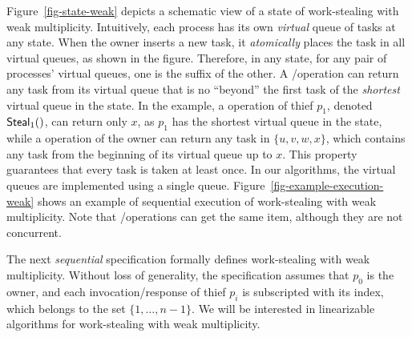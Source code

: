 Figure~\ref{fig-state-weak} depicts a schematic view of a state of work-stealing with weak multiplicity.  Intuitively, each process has its own \emph{virtual} queue of tasks at any state.  When the owner inserts a new task, it \emph{atomically} places the task in all virtual queues, as shown in the figure.  Therefore, in any state, for any pair of processes' virtual queues, one is the suffix of the other.  A \Take/\Steal operation can return any task from its virtual queue that is no ``beyond'' the first task of the \emph{shortest} virtual queue in the state. In the example, a \Steal operation of thief $p_1$, denoted ${\sf \small Steal}_1()$, can return only $x$, as $p_1$ has the shortest virtual queue in the state, while a \Take operation of the owner can return any task in $\{u,v,w,x\}$, which contains any task from the beginning of its virtual queue up to $x$.  This property guarantees that every task is taken at least once.  In our algorithms, the virtual queues are implemented using a single queue.  Figure~\ref{fig-example-execution-weak} shows an example of sequential execution of work-stealing with weak multiplicity. Note that \Take/\Steal operations can get the same item, although they are not concurrent.

The next \emph{sequential} specification formally defines work-stealing with weak multiplicity.  Without loss of generality, the specification assumes that \(p_0\) is the owner, and each invocation/response of thief \(p_i\) is subscripted with its index, which belongs to the set \(\{1, \hdots, n-1\}\).  We will be interested in linearizable algorithms for work-stealing with weak multiplicity.


